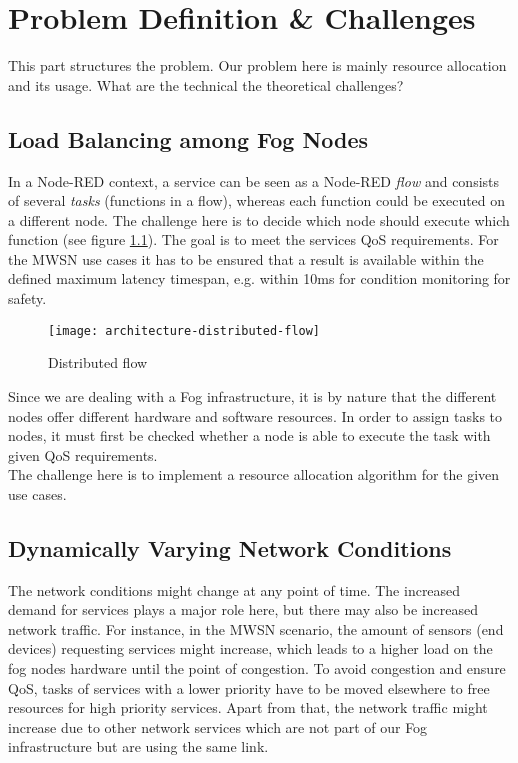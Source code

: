 \chapter{Problem Definition \& Challenges\label{cha:problem-definition}}
This part structures the problem. Our problem here is mainly resource allocation and its usage. What are the technical the theoretical challenges?

\section{Load Balancing among Fog Nodes}
In a Node-RED context, a service can be seen as a Node-RED \textit{flow} and consists of several \textit{tasks} (functions in a flow), whereas each function could be executed on a different node. The challenge here is to decide which node should execute which function (see figure \ref{fig:distributed-flow}). The goal is to meet the services QoS requirements. For the MWSN use cases it has to be ensured that a result is available within the defined maximum latency timespan, e.g. within 10ms for condition monitoring for safety.\\

\begin{figure}
    \centering
    \texttt{[image: architecture-distributed-flow]}
    \caption{Distributed flow}
    \label{fig:distributed-flow}
\end{figure}

Since we are dealing with a Fog infrastructure, it is by nature that the different nodes offer different hardware and software resources. In order to assign tasks to nodes, it must first be checked whether a node is able to execute the task with given QoS requirements.\\

The challenge here is to implement a resource allocation algorithm for the given use cases.


\section{Dynamically Varying Network Conditions}
The network conditions might change at any point of time. The increased demand for services plays a major role here, but there may also be increased network traffic. For instance, in the MWSN scenario, the amount of sensors (end devices) requesting services might increase, which leads to a higher load on the fog nodes hardware until the point of congestion. To avoid congestion and ensure QoS, tasks of services with a lower priority have to be moved elsewhere to free resources for high priority services. Apart from that, the network traffic might increase due to other network services which are not part of our Fog infrastructure but are using the same link.\\

